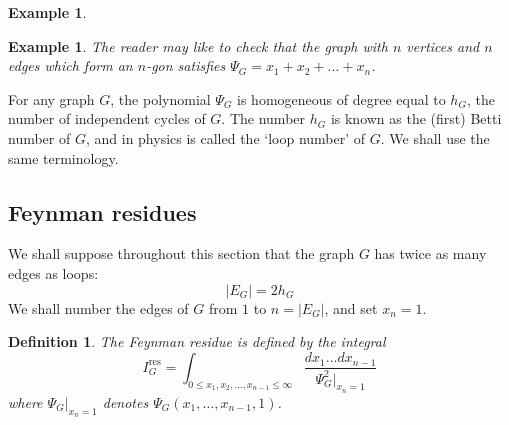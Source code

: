 \documentclass[12pt]{amsart}
\newcommand{\res}{\mathrm{res}}
\theoremstyle{plain}
\newtheorem{defn}[thm]{Definition}
\newtheorem{ex}[thm]{Example}
\newcommand{\0}{\color{blue}{\mathsf{0}}}
\begin{document}
\begin{ex}
\begin{figure}[h!]

\end{figure}

\end{ex}


\begin{ex} \label{exloopgraphs}
The reader may like to check that the graph  with $n$ vertices and $n$ edges which form an $n$-gon satisfies
$\Psi_G = x_1+ x_2 +  \ldots + x_n$. 
\end{ex} 
For any graph $G$, the polynomial $\Psi_G$ is homogeneous of degree equal to $h_G$, the number of independent cycles of $G$. The number $h_G$ is  known as the  (first) Betti number of $G$, and 
in physics  is  called the `loop number' of $G$. We shall use the same terminology.


\subsection{Feynman residues} We shall suppose throughout  this section that the graph $G$ has twice as many edges as loops:
\begin{equation} \label{edgestwiceloops} 
|E_G | = 2 h_G
\end{equation}
We shall number the edges of $G$ from $1$ to $n = |E_G|$, and set $x_n=1$. 

\begin{defn} The Feynman residue is defined  by the integral
\begin{equation}  \label{Iresdef} 
I^{\res}_G =  \int_{0 \leq x_1, x_2, \ldots, x_{n-1} \leq \infty}  \frac{dx_1\ldots dx_{n-1} }{ \Psi^2_G\Big|_{x_n=1} } 
\end{equation} 
where $\Psi_G\big|_{x_n=1}$ denotes  $\Psi_G(x_1,\ldots, x_{n-1}, 1)$. 
\end{defn} 
\end{document}
